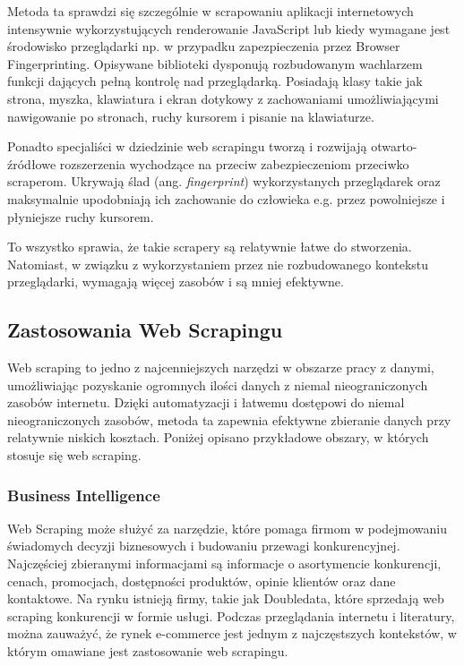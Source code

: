 Metoda ta sprawdzi się szczególnie w scrapowaniu aplikacji internetowych intensywnie wykorzystujących renderowanie JavaScript
lub kiedy wymagane jest środowisko przeglądarki np. w przypadku zapezpieczenia przez Browser Fingerprinting.
Opisywane biblioteki dysponują rozbudowanym wachlarzem funkcji dających pełną kontrolę nad przeglądarką.
Posiadają klasy takie jak strona, myszka, klawiatura i ekran dotykowy z zachowaniami umożliwiającymi nawigowanie po stronach,
ruchy kursorem i pisanie na klawiaturze.

Ponadto specjaliści w dziedzinie web scrapingu tworzą i rozwijają otwarto-źródłowe rozszerzenia wychodzące na przeciw zabezpieczeniom przeciwko scraperom.
Ukrywają ślad (ang. \emph{fingerprint}) wykorzystanych przeglądarek oraz maksymalnie upodobniają ich zachowanie do człowieka e.g. przez powolniejsze i płyniejsze ruchy kursorem.

To wszystko sprawia, że takie scrapery są relatywnie łatwe do stworzenia.
Natomiast, w związku z wykorzystaniem przez nie rozbudowanego kontekstu przeglądarki, wymagają więcej zasobów i są mniej efektywne.

\subsection{Zastosowania Web Scrapingu}\label{subsec:web-scraping-applications}

Web scraping to jedno z najcenniejszych narzędzi w obszarze pracy z danymi, umożliwiając pozyskanie ogromnych ilości danych z niemal nieograniczonych zasobów internetu\cite{Zhao2017}.
Dzięki automatyzacji i łatwemu dostępowi do niemal nieograniczonych zasobów, metoda ta zapewnia efektywne zbieranie danych przy relatywnie niskich kosztach.
Poniżej opisano przykładowe obszary, w których stosuje się web scraping.

\subsubsection{Business Intelligence}
Web Scraping może służyć za narzędzie, które pomaga firmom w podejmowaniu świadomych decyzji biznesowych i budowaniu przewagi konkurencyjnej.
Najczęściej zbieranymi informacjami są informacje o asortymencie konkurencji, cenach, promocjach, dostępności produktów, opinie klientów oraz dane kontaktowe.
Na rynku istnieją firmy, takie jak Doubledata\cite{doubledata}, które sprzedają web scraping konkurencji w formie usługi.
Podczas przeglądania internetu i literatury, można zauważyć, że rynek e-commerce jest jednym z najczęstszych kontekstów, w którym omawiane jest zastosowanie web scrapingu.

